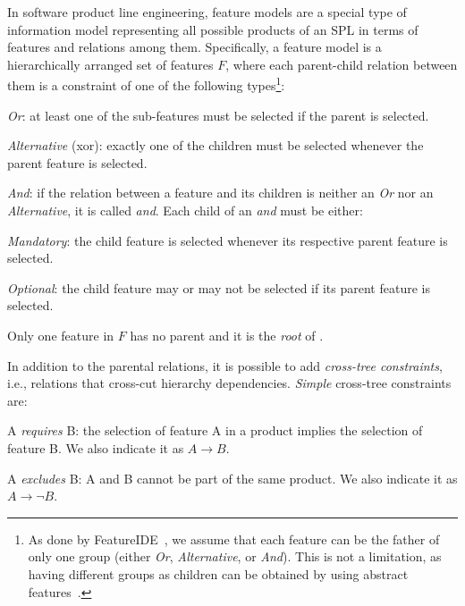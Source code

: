 \begin{tikzborder}{\cite{Gargantini16:validation}}
\begin{tikzborder}{\cite{gargantini_combinatorial_2017}}
\begin{tikzborder}{\cite{gargantini_combinatorial_2017}}
\begin{tikzborder}{\cite{garn2019}}
\begin{tikzborder}{\cite{arcaini2019achieving}}
	In software product line engineering, feature models are a special type of information model representing all possible products of an SPL in terms of features and relations among them. Specifically, a feature model \fm is a hierarchically arranged set of features $F$, where each parent-child relation between them is a constraint of one of the following types\footnote{As done by FeatureIDE~\cite{FeatureIDEbook}, we assume that each feature can be the father of only one group (either {\it Or}, {\it Alternative}, or {\it And}). This is not a limitation, as having different groups as children can be obtained by using abstract features~\cite{thum_abstract_2011}.}:
	\begin{compactitem}
		\item \textit{Or}: at least one of the sub-features must be selected if the parent is selected.
		\item \textit{Alternative} (xor): exactly one of the children must be selected whenever the parent feature is selected.
		\item \textit{And}: if the relation between a feature and its children is neither an \textit{Or} nor an \textit{Alternative}, it is called \textit{and}. Each child of an \textit{and} must be either:
		\begin{compactitem}
			\item \textit{Mandatory}: the child feature is selected whenever its respective parent feature is selected.
			\item \textit{Optional}: the child feature may or may not be selected if its parent feature is selected.
		\end{compactitem}
	\end{compactitem}
	
	Only one feature in $F$ has no parent and it is the \emph{root} of \fm.
	
	In addition to the parental relations, it is possible to add \emph{cross-tree constraints}, i.e., relations that cross-cut hierarchy dependencies. {\it Simple} cross-tree constraints are:
	\begin{compactitem}
		\item A {\it requires} B: the selection of feature A in a product implies the selection of feature B. We also indicate it as $A \rightarrow B$.
		\item A {\it excludes} B: A and B cannot be part of the same product. We also indicate it as $A \rightarrow \neg B$.
	\end{compactitem}
	

\end{tikzborder}
\end{tikzborder}
\end{tikzborder}
\end{tikzborder}
\end{tikzborder}
